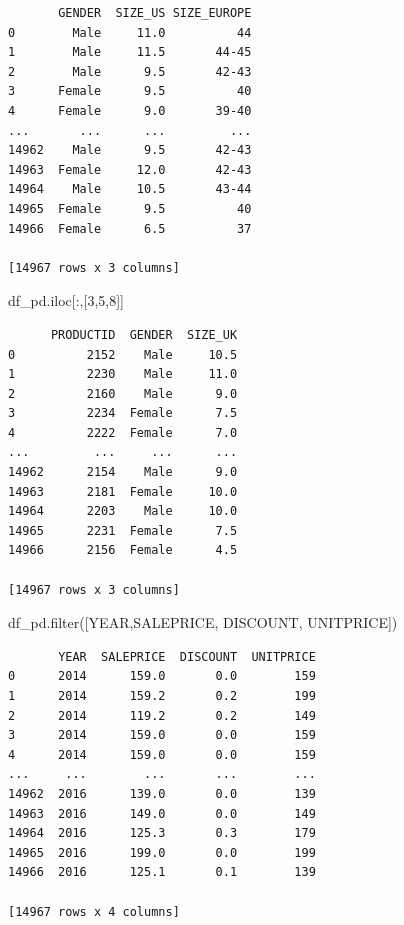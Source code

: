 \documentclass[
  letterpaper,
  DIV=11,
  numbers=noendperiod]{scrreprt}
\newenvironment{Shaded}{\begin{snugshade}}{\end{snugshade}}
\newcommand{\BuiltInTok}[1]{\textcolor[rgb]{0.00,0.23,0.31}{#1}}
\newcommand{\DecValTok}[1]{\textcolor[rgb]{0.68,0.00,0.00}{#1}}
\newcommand{\NormalTok}[1]{\textcolor[rgb]{0.00,0.23,0.31}{#1}}
\newcommand{\StringTok}[1]{\textcolor[rgb]{0.13,0.47,0.30}{#1}}
\begin{document}
\begin{verbatim}
       GENDER  SIZE_US SIZE_EUROPE
0        Male     11.0          44
1        Male     11.5       44-45
2        Male      9.5       42-43
3      Female      9.5          40
4      Female      9.0       39-40
...       ...      ...         ...
14962    Male      9.5       42-43
14963  Female     12.0       42-43
14964    Male     10.5       43-44
14965  Female      9.5          40
14966  Female      6.5          37

[14967 rows x 3 columns]
\end{verbatim}

\begin{Shaded}
\begin{Highlighting}[]
\NormalTok{df\_pd.iloc[:,[}\DecValTok{3}\NormalTok{,}\DecValTok{5}\NormalTok{,}\DecValTok{8}\NormalTok{]]}
\end{Highlighting}
\end{Shaded}

\begin{verbatim}
      PRODUCTID  GENDER  SIZE_UK
0          2152    Male     10.5
1          2230    Male     11.0
2          2160    Male      9.0
3          2234  Female      7.5
4          2222  Female      7.0
...         ...     ...      ...
14962      2154    Male      9.0
14963      2181  Female     10.0
14964      2203    Male     10.0
14965      2231  Female      7.5
14966      2156  Female      4.5

[14967 rows x 3 columns]
\end{verbatim}

\begin{Shaded}
\begin{Highlighting}[]
\NormalTok{df\_pd.}\BuiltInTok{filter}\NormalTok{([}\StringTok{\textquotesingle{}YEAR\textquotesingle{}}\NormalTok{,}\StringTok{\textquotesingle{}SALEPRICE\textquotesingle{}}\NormalTok{, }\StringTok{\textquotesingle{}DISCOUNT\textquotesingle{}}\NormalTok{, }\StringTok{\textquotesingle{}UNITPRICE\textquotesingle{}}\NormalTok{])}
\end{Highlighting}
\end{Shaded}

\begin{verbatim}
       YEAR  SALEPRICE  DISCOUNT  UNITPRICE
0      2014      159.0       0.0        159
1      2014      159.2       0.2        199
2      2014      119.2       0.2        149
3      2014      159.0       0.0        159
4      2014      159.0       0.0        159
...     ...        ...       ...        ...
14962  2016      139.0       0.0        139
14963  2016      149.0       0.0        149
14964  2016      125.3       0.3        179
14965  2016      199.0       0.0        199
14966  2016      125.1       0.1        139

[14967 rows x 4 columns]
\end{verbatim}
\end{document}
